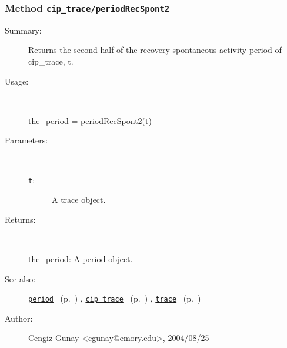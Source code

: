 \subsubsection[Method \texttt{periodRecSpont2}]{Method \texttt{cip\_trace/periodRecSpont2}}%
%
\label{ref_cip_trace__periodRecSpont2}%
\hypertarget{ref_cip_trace__periodRecSpont2}{}%
\begin{description}
\item[Summary:]Returns the second half of the recovery spontaneous
		 activity period of cip\_trace, t. 
%
\item[Usage:]~%
\begin{lyxcode}%
the\_period = periodRecSpont2(t)
%
\end{lyxcode}%
%
%
\item[Parameters:]~
\begin{description}%
\item[\texttt{t}:]
 A trace object.
\end{description}%
%
\item[Returns:
]~

	the\_period: A period object.
%
%
\item[See also:]%
\hyperlink{ref_period}{\texttt{period}}%
\ (p.~\pageref{ref_period})%
%
, \hyperlink{ref_cip_trace}{\texttt{cip\_trace}}%
\ (p.~\pageref{ref_cip_trace})%
%
, \hyperlink{ref_trace}{\texttt{trace}}%
\ (p.~\pageref{ref_trace})%
%
%
\item[Author:]%
Cengiz Gunay <cgunay@emory.edu>, 2004/08/25
%
\end{description}
\methodline%
